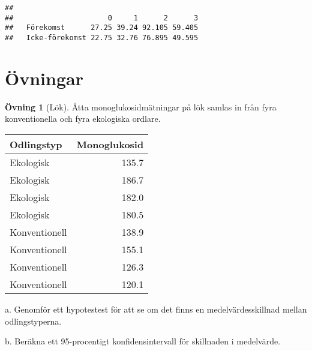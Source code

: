 \documentclass[
]{book}
\theoremstyle{definition}
\theoremstyle{definition}
\theoremstyle{definition}
\newtheorem{exercise}{Övning}[chapter]
\theoremstyle{definition}
\theoremstyle{remark}
\begin{document}
\begin{verbatim}
##                 
##                      0     1      2      3
##   Förekomst      27.25 39.24 92.105 59.405
##   Icke-förekomst 22.75 32.76 76.895 49.595
\end{verbatim}

\hypertarget{uxf6vningar-3}{%
\section{Övningar}\label{uxf6vningar-3}}

\begin{exercise}[Lök]
Åtta monoglukosidmätningar på lök samlas in från fyra konventionella och fyra ekologiska ordlare.

\begin{table}
\centering
\begin{tabular}[t]{lr}
\toprule
Odlingstyp & Monoglukosid\\
\midrule
Ekologisk & 135.7\\
Ekologisk & 186.7\\
Ekologisk & 182.0\\
Ekologisk & 180.5\\
Konventionell & 138.9\\
\addlinespace
Konventionell & 155.1\\
Konventionell & 126.3\\
Konventionell & 120.1\\
\bottomrule
\end{tabular}
\end{table}

a. Genomför ett hypotestest för att se om det finns en medelvärdesskillnad mellan odlingstyperna.

b. Beräkna ett 95-procentigt konfidensintervall för skillnaden i medelvärde.
\end{exercise}
\end{document}
